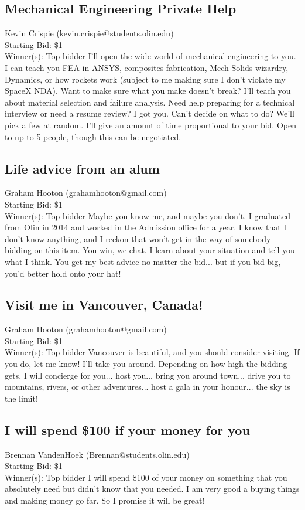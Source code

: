 \documentclass[11pt]{article}
\begin{document}
\subsection{Mechanical Engineering Private Help}
Kevin Crispie (kevin.crispie@students.olin.edu) \\
Starting Bid: \$1 \\
Winner(s): 
Top bidder\newline
I’ll open the wide world of mechanical engineering to you. I can teach you FEA in ANSYS, composites fabrication, Mech Solids wizardry, Dynamics, or how rockets work (subject to me making sure I don’t violate my SpaceX NDA). Want to make sure what you make doesn’t break? I’ll teach you about material selection and failure analysis. Need help preparing for a technical interview or need a resume review? I got you. Can’t decide on what to do? We’ll pick a few at random. I’ll give an amount of time proportional to your bid. Open to up to 5 people, though this can be negotiated.
\subsection{Life advice from an alum}
Graham Hooton (grahamhooton@gmail.com) \\
Starting Bid: \$1 \\
Winner(s): 
Top bidder\newline
Maybe you know me, and maybe you don't. I graduated from Olin in 2014 and worked in the Admission office for a year. I know that I don't know anything, and I reckon that won't get in the way of somebody bidding on this item.
You win, we chat. I learn about your situation and tell you what I think. You get my best advice no matter the bid... but if you bid big, you'd better hold onto your hat!
\subsection{Visit me in Vancouver, Canada!}
Graham Hooton (grahamhooton@gmail.com) \\
Starting Bid: \$1 \\
Winner(s): 
Top bidder\newline
Vancouver is beautiful, and you should consider visiting. If you do, let me know! I'll take you around. Depending on how high the bidding gets, I will concierge for you... host you... bring you around town... drive you to mountains, rivers, or other adventures... host a gala in your honour... the sky is the limit!
\subsection{I will spend \$100 if your money for you}
Brennan VandenHoek (Brennan@students.olin.edu) \\
Starting Bid: \$1 \\
Winner(s): 
Top bidder\newline
I will spend \$100 of your money on something that you absolutely need but didn’t know that you needed. I am very good a buying things and making money go far. So I promise it will be great! 
\end{document}
